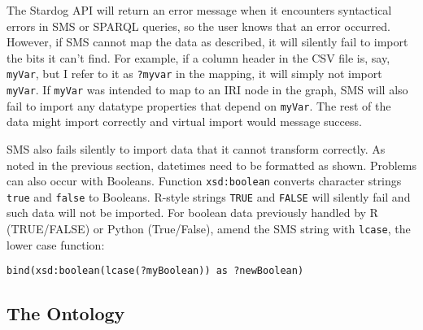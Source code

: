 \documentclass{article}\usepackage[]{graphicx}\usepackage[]{xcolor}
\begin{document}
The Stardog API will return an error message when it encounters syntactical errors in SMS or SPARQL queries, so the user knows that an error occurred. However, if SMS cannot map the data as described, it will silently fail to import the bits it can't find. For example, if a column header in the CSV file is, say, \texttt{myVar}, but I refer to it as \texttt{?myvar} in the mapping, it will simply not import \texttt{myVar}. If \texttt{myVar} was intended to map to an IRI node in the graph, SMS will also fail to import any datatype properties that depend on \texttt{myVar}. The rest of the data might import correctly and virtual import would message success.

SMS also fails silently to import data that it cannot transform correctly. As noted in the previous section, datetimes need to be formatted as shown. Problems can also occur with Booleans. Function \texttt{xsd:boolean} converts character strings \texttt{true} and \texttt{false} to Booleans. R-style strings \texttt{TRUE} and \texttt{FALSE} will silently fail and such data will not be imported. For boolean data previously handled by R (TRUE/FALSE) or Python (True/False), amend the SMS string with \texttt{lcase}, the lower case function:

\begin{verbatim}
bind(xsd:boolean(lcase(?myBoolean)) as ?newBoolean)
\end{verbatim}

\subsection{The Ontology}
\end{document}
